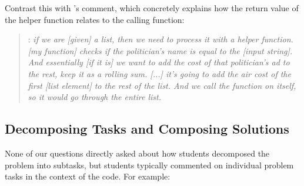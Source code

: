 
\noindent
Contrast this with \ssix's comment, which
concretely explains how the return value of the helper function
relates to the calling function:



\begin{quote}
\ssix: \textit{
if we are [given] a list, then we need to process it with a helper
function. [my function] checks if the politician's name is equal to
the [input string]. And essentially [if it is] we want to add the cost of that politician's ad to the rest, keep it as a rolling sum. [...] it's going to add the air cost of the first [list element] to the rest of the list. And we call the function on itself, so it would go through the entire list.}
\end{quote}

\subsection*{Decomposing Tasks and Composing Solutions}

None of our questions directly asked about how students decomposed the
problem into subtasks, but students typically commented on individual
problem tasks in the context of the code.  For example:


